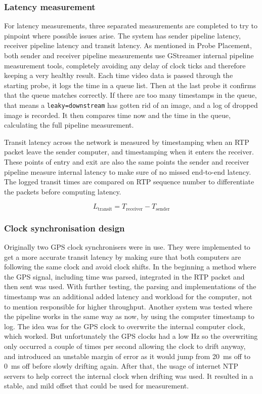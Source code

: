 \subsubsection{Latency measurement}
For latency measurements, three separated measurements are completed to try to pinpoint where possible issues arise. The system has sender pipeline latency, receiver pipeline latency and transit latency. As mentioned in Probe Placement, both sender and receiver pipeline measurements use GStreamer internal pipeline measurement tools, completely avoiding any delay of clock ticks and therefore keeping a very healthy result. Each time video data is passed through the starting probe, it logs the time in a queue list. Then at the last probe it confirms that the queue matches correctly. If there are too many timestamps in the queue, that means a \texttt{leaky=downstream} has gotten rid of an image, and a log of dropped image is recorded. It then compares time now and the time in the queue, calculating the full pipeline measurement.

Transit latency across the network is measured by timestamping when an RTP packet leave the sender computer, and timestamping when it enters the receiver. These points of entry and exit are also the same points the sender and receiver pipeline measure internal latency to make sure of no missed end-to-end latency. The logged transit times are compared on RTP sequence number to differentiate the packets before computing latency.

\begin{equation}
  L_{\text{transit}}  = T_{\text{receiver}} - T_{\text{sender}}
\end{equation}

\subsubsection{Clock synchronisation design}
Originally two GPS clock synchronisers were in use. They were implemented to get a more accurate transit latency by making sure that both computers are following the same clock and avoid clock shifts. In the beginning a method where the GPS signal, including time was parsed, integrated in the RTP packet and then sent was used. With further testing, the parsing and implementations of the timestamp was an additional added latency and workload for the computer, not to mention responsible for higher throughput. Another system was tested where the pipeline works in the same way as now, by using the computer timestamp to log. The idea was for the GPS clock to overwrite the internal computer clock, which worked. But unfortunately the GPS clocks had a low Hz so the overwriting only occurred a couple of times per second allowing the clock to drift anyway, and introduced an unstable margin of error as it would jump from 20~ms off to 0~ms off before slowly drifting again. After that, the usage of internet NTP servers to help correct the internal clock when drifting was used. It resulted in a stable, and mild offset that could be used for measurement.

